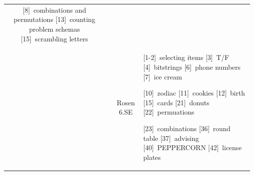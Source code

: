 \documentclass{article}
\def\hwn#1{\relax}
\def\hwn#1{\ {\tiny (#1)}}
\def\hwn#1{$_{\mbox{\ \tiny #1}}$}
\def\hwn#1{~{\tiny #1}}
\newcommand{\extra}[2][\relax]{[#2]\hwn{#1}}
\begin{document}
\begin{center}
\begin{longtable}{|c|c|c|p{4.3in}|}
	 \extra[combinations and permutations]{8}
	 \extra[counting problem schemas]{13}
	 \extra[scrambling letters]{15}
	 \\
	 & & Rosen 6.SE &
	 \extra[selecting items]{1-2}
	 \extra[T/F]{3}
	 \extra[bitstrings]{4}
	 \extra[phone numbers]{6}
	 \extra[ice cream]{7}

	 \extra[zodiac]{10}
	 \extra[cookies]{11}
	 \extra[birth]{12}
	 \extra[cards]{15}
	 \extra[donuts]{21}
	 \extra[permuations]{22}

	 \extra[combinations]{23}
	 \extra[round table]{36}
	 \extra[advising]{37}
	 \extra[PEPPERCORN]{40}
	 \extra[license plates]{42}
	 \\
	 \hline
\end{longtable}
\end{center}
\label{end}
\end{document}
